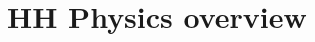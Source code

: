 \chapter{HH Physics overview}
\label{ch:hh-phys}

\def\kl{$\kappa_\lambda$}

\def\figpath{figures/nr-int-note/intro/V1/}




